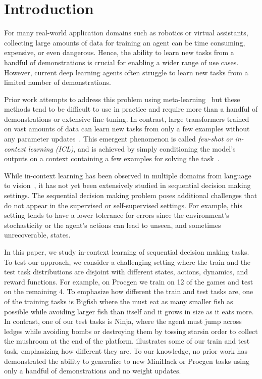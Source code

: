 \section{Introduction}
For many real-world application domains such as robotics or virtual assistants, collecting large amounts of data for training an agent can be time consuming, expensive, or even dangerous.
Hence, the ability to learn new tasks from a handful of demonstrations is crucial for enabling a wider range of use cases. 
However, current deep learning agents often struggle to learn new tasks from a limited number of demonstrations.

Prior work attempts to address this problem using meta-learning~\citep{schmidhuber1987evolutionary,duan2016rl,finn2017model,pong2022offline, mitchell2021offline,beck2023survey} but these methods tend to be difficult to use in practice and require more than a handful of demonstrations or extensive fine-tuning. 
In contrast, large transformers trained on vast amounts of data can learn new tasks from only a few examples without any parameter updates~\citep{gpt3, scaling-laws, olsson2022incontext, zipfian_icl}. This emergent phenomenon is called \textit{few-shot or in-context learning (ICL)}, and is achieved by simply conditioning the model's outputs on a context containing a few examples for solving the task~\citep{gpt3, Ganguli_2022, wei2022emergent}. 

While in-context learning has been observed in multiple domains from language~\citep{gpt3} to vision~\citep{zipfian_icl}, it has not yet been extensively studied in sequential decision making settings. The sequential decision making problem poses additional challenges that do not appear in the supervised or self-supervised settings. For example, this setting tends to have a lower tolerance for errors since the environment's stochasticity or the agent's actions can lead to unseen, and sometimes unrecoverable, states. 

In this paper, we study in-context learning of sequential decision making tasks. To test our approach, we consider a challenging setting where the train and the test task distributions are disjoint with different states, actions, dynamics, and reward functions. For example, on Procgen we train on 12 of the games and test on the remaining 4. To emphasize how different the train and test tasks are, one of the training tasks is Bigfish where the must eat as many smaller fish as possible while avoiding larger fish than itself and it grows in size as it eats more. In contrast, one of our test tasks is Ninja, where the agent must jump across ledges while avoiding bombs or destroying them by tossing starsin order to collect the mushroom at the end of the platform.  illustrates some of our train and test task, emphasizing how different they are. To our knowledge, no prior work has demonstrated the ability to generalize to new MiniHack or Procgen tasks using only a handful of demonstrations and no weight updates.


